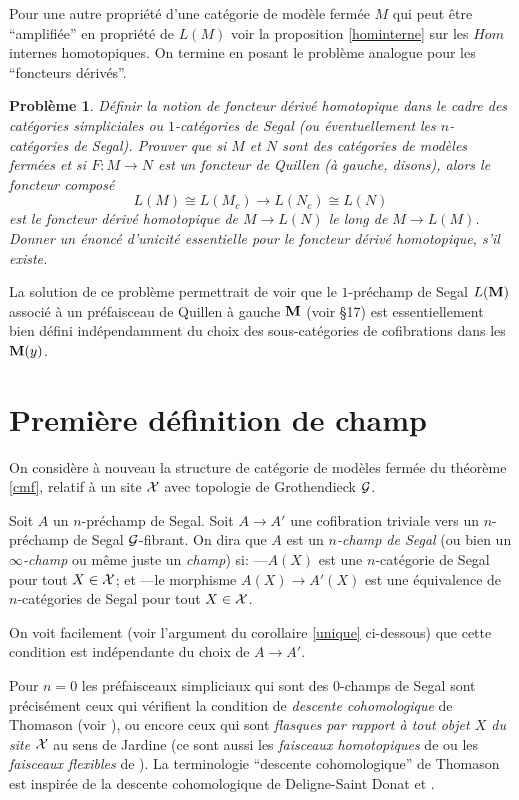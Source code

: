 \documentclass[12pt]{article}
\newcommand{\numero}[1]{\newpage\section{#1}}
\newtheorem{probleme}[lemma]{Probl\`eme}
\newcommand{\mm}{{\bf M}}
\newcommand{\Gg}{{\cal G}}
\newcommand{\Xx}{{\cal X}}
\begin{document}
Pour une autre propri\'et\'e d'une cat\'egorie de mod\`ele ferm\'ee
$M$ qui peut
\^etre ``amplifi\'ee''
en propri\'et\'e de $L(M)$ voir la proposition
\ref{hominterne} sur les $Hom$ internes homotopiques.
On termine en posant le probl\`eme analogue pour les ``foncteurs
d\'eriv\'es''.

\begin{probleme}
\label{derive}
D\'efinir la notion de {\em foncteur d\'eriv\'e homotopique} dans le cadre des
cat\'egories simpliciales ou $1$-cat\'egories de Segal (ou \'eventuellement les
$n$-cat\'egories de Segal). Prouver que si $M$ et $N$ sont des cat\'egories de
mod\`eles ferm\'ees et si $F: M\rightarrow N$ est un foncteur de Quillen (\`a
gauche, disons), alors le foncteur compos\'e
$$
L(M)\cong L(M_c)\rightarrow L(N_c)\cong L(N)
$$
est le foncteur d\'eriv\'e homotopique de $M\rightarrow L(N)$ le long de
$M\rightarrow L(M)$. Donner un \'enonc\'e d'unicit\'e essentielle pour le
foncteur d\'eriv\'e homotopique, s'il existe.
\end{probleme}

La solution de
ce probl\`eme permettrait de voir que le $1$-pr\'echamp de Segal
$L(\mm )$ associ\'e \`a un pr\'efaisceau de Quillen \`a gauche $\mm$ (voir
\S 17)
est essentiellement bien d\'efini ind\'ependamment du choix des
sous-cat\'egories
de cofibrations dans les $\mm (y)$.


\numero{Premi\`ere d\'efinition de champ}
\label{notionchamppage}

On consid\`ere \`a nouveau la structure de cat\'egorie de
mod\`eles ferm\'ee du th\'eor\`eme \ref{cmf}, relatif \`a un site $\Xx$ avec
topologie de Grothendieck $\Gg$.

Soit $A$ un $n$-pr\'echamp de Segal.
Soit $A\rightarrow A'$ une cofibration triviale vers un $n$-pr\'echamp de Segal
$\Gg$-fibrant.  On dira que $A$ est un {\em $n$-champ de Segal} (ou bien un {\em
$\infty$-champ} ou m\^eme juste un {\em champ}) si: \newline
---$A(X)$ est une $n$-cat\'egorie de Segal pour tout $X\in \Xx$; et
\newline
---le morphisme $A(X)\rightarrow A'(X)$ est une \'equivalence de
$n$-cat\'egories de Segal pour tout $X\in \Xx$.

On voit facilement (voir l'argument du corollaire \ref{unique} ci-dessous) que
cette condition est ind\'ependante du choix de $A\rightarrow A'$.

Pour $n=0$ les pr\'efaisceaux simpliciaux qui sont des $0$-champs de Segal sont
pr\'e\-ci\-s\'e\-ment ceux
qui v\'erifient
la condition de {\em descente cohomologique} de Thomason (voir
\cite{TravauxThomason}), ou encore ceux qui sont {\em
flasques
par rapport \`a tout objet $X$ du site $\Xx$} au sens de Jardine \cite{Jardine}
(ce sont aussi les {\em faisceaux homotopiques} de
\cite{kobe}
ou les {\em faisceaux flexibles} de \cite{flexible}). La terminologie
``descente cohomologique''
de Thomason est inspir\'ee de la descente cohomologique de Deligne-Saint Donat \cite{SGA4b}
et \cite{HodgeIII}.
\end{document}
